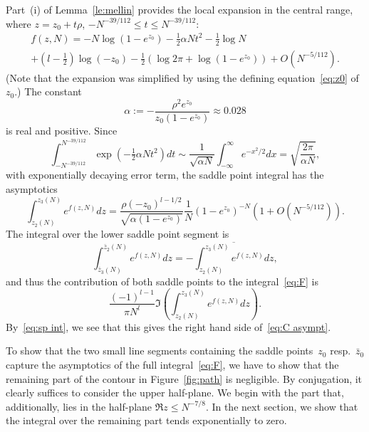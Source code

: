 \documentclass[a4paper]{amsart}
\begin{document}
Part~(i) of Lemma~\ref{le:mellin} provides the local
expansion in the central range, where $z=z_0+t\rho$,
$-N^{-39/112}\leq t \leq N^{-39/112}$:
\begin{multline}\label{eq:loc expans}
  f(z,N) = - N \log(1 -e^{z_0}) -\tfrac12 \alpha N t^2 - \tfrac12 \log N \\
     + (l-\tfrac12)\log(-z_0) -\tfrac12 (\log2\pi +\log(1-e^{z_0}))
      + O(N^{-5/112}).
\end{multline}
(Note that the expansion was simplified by using the defining equation~\eqref{eq:z0}
of~$z_0$.) The constant
\[
  \alpha := -\frac{\rho^2e^{z_0}} {z_0(1-e^{z_0})} \approx 0.028
\]
is real and positive. Since
\[
  \int_{-N^{-39/112}}^{N^{-39/112}}\exp(-\tfrac12 \alpha N t^2)dt
  \sim \frac{1}{\sqrt{\alpha N}}\int_{-\infty}^{\infty}e^{-x^2/2}dx
  = \sqrt{\frac{2\pi}{\alpha N}},
\]
with exponentially decaying error term,
the saddle point integral has the asymptotics
\begin{equation}\label{eq:sp int}
  \int_{z_2(N)}^{z_3(N)} e^{f(z,N)}dz =
  \frac{\rho(-z_0)^{l-1/2}}{ \sqrt{\alpha(1-e^{z_0})}}
  \frac1N (1-e^{z_0})^{-N}(1+O(N^{-5/112})).
\end{equation}
The integral over the lower saddle point segment is
\[
  \int_{\bar{z}_3(N)}^{\bar{z}_2(N)}e^{f(z,N)}dz =
    - \overline{\int_{z_2(N)}^{z_3(N)} e^{f(z,N)}dz},
\]
and thus the contribution of both saddle points to the integral~\eqref{eq:F}
is
\[
   \frac{(-1)^{l-1}}{\pi N^l} \Im \left(
     \int_{z_2(N)}^{z_3(N)} e^{f(z,N)}dz \right).
\]
By~\eqref{eq:sp int}, we see that this gives the right hand
side of~\eqref{eq:C asympt}.

To show that the two small line segments containing the saddle points~$z_0$
resp.~$\bar{z}_0$ capture
the asymptotics of the full integral~\eqref{eq:F},
we have to show that the remaining part of the contour in Figure~\ref{fig:path}
is negligible. 
By conjugation, it clearly suffices to consider
the upper half-plane.
We begin with the part that, additionally, lies
in the half-plane $\Re z \leq N^{-7/8}$. In the next section,
we show that the integral over the remaining part tends exponentially to zero.
\end{document}
